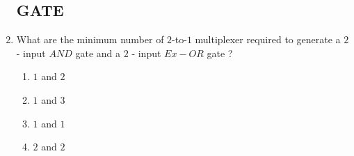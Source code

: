 \documentclass[12pt,-letter paper]{article}
\begin{document}
 \begin{enumerate}

          \subsection*{GATE}

 \item What are the minimum number of $2$-to-$1$ multiplexer required to generate a $2$ - input $AND$ gate and a $2$ - input $Ex-OR$ gate ?
 \begin{enumerate}
 \item $1$ and $2$
 \item $1$ and $3$
 \item $1$ and $1$
 \item $2$ and $2$
 \end{enumerate}
\end {enumerate}
\end{document}
